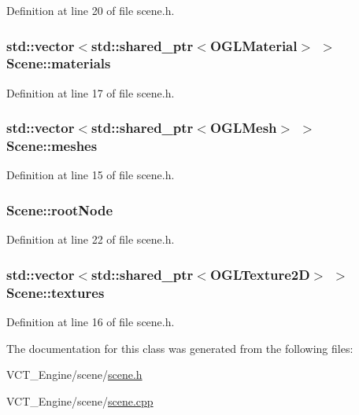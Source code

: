 Definition at line 20 of file scene.\+h.

\hypertarget{class_scene_a631fe5acccb40e34b55e22d8b941e010}{}
\subsubsection[{materials}]{\setlength{\rightskip}{0pt plus 5cm}std\+::vector$<$std\+::shared\+\_\+ptr$<${\bf O\+G\+L\+Material}$>$ $>$ Scene\+::materials}\label{class_scene_a631fe5acccb40e34b55e22d8b941e010}


Definition at line 17 of file scene.\+h.

\hypertarget{class_scene_aefec91bb2a143b58040a5962209d4b34}{}
\subsubsection[{meshes}]{\setlength{\rightskip}{0pt plus 5cm}std\+::vector$<$std\+::shared\+\_\+ptr$<${\bf O\+G\+L\+Mesh}$>$ $>$ Scene\+::meshes}\label{class_scene_aefec91bb2a143b58040a5962209d4b34}


Definition at line 15 of file scene.\+h.

\hypertarget{class_scene_a14b82ab277b794679fa68873a3920fd7}{}
\subsubsection[{root\+Node}]{ Scene\+::root\+Node}\label{class_scene_a14b82ab277b794679fa68873a3920fd7}


Definition at line 22 of file scene.\+h.

\hypertarget{class_scene_a9ac78c1e7dcb0e243c7279afff526661}{}
\subsubsection[{textures}]{\setlength{\rightskip}{0pt plus 5cm}std\+::vector$<$std\+::shared\+\_\+ptr$<${\bf O\+G\+L\+Texture2\+D}$>$ $>$ Scene\+::textures}\label{class_scene_a9ac78c1e7dcb0e243c7279afff526661}


Definition at line 16 of file scene.\+h.



The documentation for this class was generated from the following files\+:\begin{DoxyCompactItemize}
\item 
V\+C\+T\+\_\+\+Engine/scene/\hyperlink{scene_8h}{scene.\+h}\item 
V\+C\+T\+\_\+\+Engine/scene/\hyperlink{scene_8cpp}{scene.\+cpp}\end{DoxyCompactItemize}

